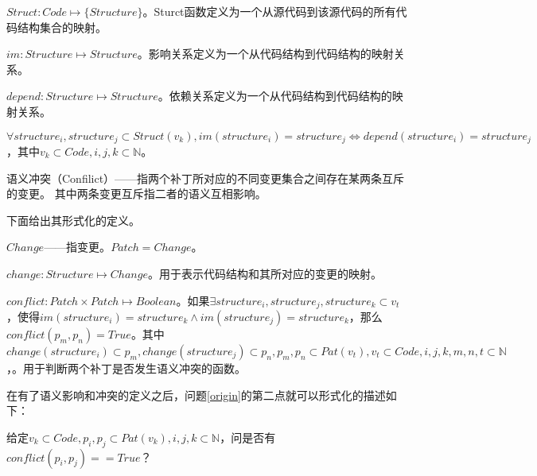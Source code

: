 \begin{definition}
	$Struct: Code \mapsto \{ Structure \}$。Sturct函数定义为一个从源代码到该源代码的所有代码结构集合的映射。
\end{definition}

\begin{definition}
	$im: Structure \mapsto Structure$。影响关系定义为一个从代码结构到代码结构的映射关系。
\end{definition}

\begin{definition}
	$depend: Structure \mapsto Structure$。依赖关系定义为一个从代码结构到代码结构的映射关系。
\end{definition}

\begin{definition}
	$\forall structure_i,structure_j \subset Struct(v_k),  im(structure_i) = structure_j \iff depend(structure_i) = structure_j$，其中$v_k \subset Code,i,j,k \subset \mathbb{N}$。
\end{definition}


\begin{definition}
	\label {define_conflict}
	语义冲突（Confilict）——指两个补丁所对应的不同变更集合之间存在某两条互斥的变更。
	其中两条变更互斥指二者的语义互相影响。
\end{definition}

下面给出其形式化的定义。

\begin{definition}
	$Change$——指变更。$Patch = {Change}$。
\end{definition}

\begin{definition}
	$change: Structure \mapsto Change$。用于表示代码结构和其所对应的变更的映射。
\end{definition}


\begin{definition}
	$conflict: Patch \times Patch \mapsto Boolean$。如果$\exists structure_i,structure_j,structure_k \subset v_t$，使得$im(structure_i) = structure_k \land im(structure_j) = structure_k$，那么$conflict(p_m,p_n) = True$。其中$change(structure_i) \subset p_m,change(structure_j) \subset p_n,p_m,p_n \subset Pat(v_t),v_t \subset Code,i,j,k,m,n,t \subset \mathbb{N}$，。用于判断两个补丁是否发生语义冲突的函数。
\end{definition}

在有了语义影响和冲突的定义之后，问题\ref {origin}的第二点就可以形式化的描述如下：

\begin{problem}
	\label {compatible_formal}
	给定$v_k \subset Code, p_i,p_j \subset Pat(v_k),i,j,k \subset \mathbb{N}$，问是否有$conflict(p_i,p_j) == True$？
\end{problem}

